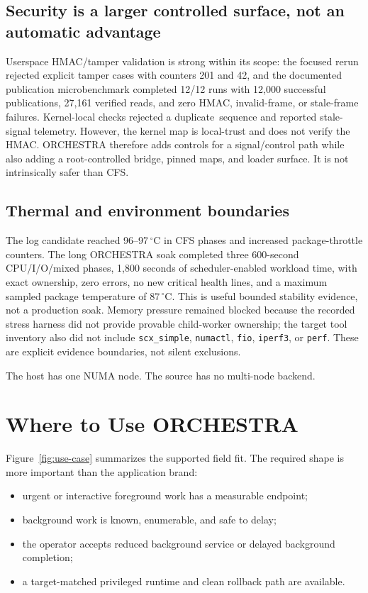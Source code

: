 \documentclass[10pt,letterpaper,twocolumn]{article}
\begin{document}
\subsection{Security is a larger controlled surface, not an automatic advantage}

Userspace HMAC/tamper validation is strong within its scope: the focused rerun rejected explicit tamper cases with counters 201 and 42, and the documented publication microbenchmark completed 12/12 runs with 12,000 successful publications, 27,161 verified reads, and zero HMAC, invalid-frame, or stale-frame failures. Kernel-local checks rejected a \mbox{duplicate sequence} and reported stale-signal telemetry. However, the kernel map is local-trust and does not verify the HMAC. ORCHESTRA therefore adds controls for a signal/control path while also adding a root-controlled bridge, pinned maps, and loader surface. It is not intrinsically safer than CFS.

\subsection{Thermal and environment boundaries}

The log candidate reached 96--97\,$^\circ$C in CFS phases and increased package-throttle counters. The long ORCHESTRA soak completed three 600-second CPU/I/O/mixed phases, 1,800 seconds of scheduler-enabled workload time, with exact ownership, zero errors, no new critical health lines, and a maximum sampled package temperature of 87\,$^\circ$C. This is useful bounded stability evidence, not a production soak. Memory pressure remained blocked because the recorded stress harness did not provide provable child-worker ownership; the target tool inventory also did not include \texttt{scx\_simple}, \texttt{numactl}, \texttt{fio}, \texttt{iperf3}, or \texttt{perf}. These are explicit evidence boundaries, not silent exclusions.

The host has one NUMA node. The source has no multi-node backend.

\section{Where to Use ORCHESTRA}

Figure~\ref{fig:use-case} summarizes the supported field fit. The required shape is more important than the application brand:

\begin{itemize}
  \item urgent or interactive foreground work has a measurable endpoint;
  \item background work is known, enumerable, and safe to delay;
  \item the operator accepts reduced background service or delayed background completion;
  \item a target-matched privileged runtime and clean rollback path are available.
\end{itemize}
\end{document}
